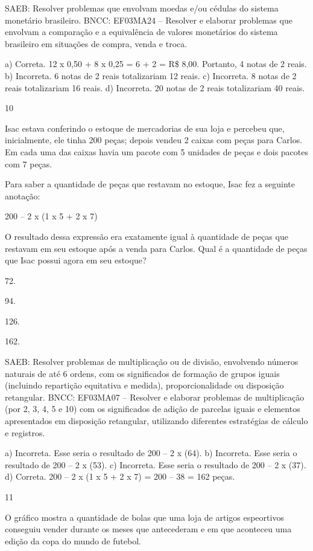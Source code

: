 \begin{multicols}{2}
{\begin{escolha}
{SAEB: Resolver problemas que envolvam moedas e/ou cédulas do sistema monetário brasileiro.
BNCC: EF03MA24 -- Resolver e elaborar problemas que envolvam a comparação e a equivalência de
valores monetários do sistema brasileiro em situações de compra, venda e troca.

a) Correta. 12 x 0,50 + 8 x 0,25 = 6 + 2 = R\$ 8,00. Portanto, 4 notas de 2 reais.
b) Incorreta. 6 notas de 2 reais totalizariam 12 reais.
c) Incorreta. 8 notas de 2 reais totalizariam 16 reais.
d) Incorreta. 20 notas de 2 reais totalizariam 40 reais.

\num{10}

Isac estava conferindo o estoque de mercadorias de sua loja e percebeu que, inicialmente, ele tinha 200 peças; depois vendeu 2 caixas com peças para Carlos. Em cada uma das caixas havia um pacote com 5 unidades de peças e dois pacotes com 7 peças.

Para saber a quantidade de peças que restavam no estoque, Isac fez a seguinte anotação:

200 -- 2 x (1 x 5 + 2 x 7)

O resultado dessa expressão era exatamente igual à quantidade de peças que restavam em seu estoque após a venda para Carlos. Qual é a quantidade de peças que Isac possui agora em seu estoque?

\begin{escolha}
\item
  72.
\item
  94.
\item
  126.
\item
  162.
\end{escolha}

SAEB: Resolver problemas de multiplicação ou de divisão, envolvendo números naturais de até 6 ordens, com os significados de formação de grupos iguais (incluindo repartição equitativa e medida), proporcionalidade ou disposição retangular.
BNCC: EF03MA07 – Resolver e elaborar problemas de multiplicação (por 2, 3, 4, 5 e 10) com os
significados de adição de parcelas iguais e elementos apresentados em disposição retangular, utilizando diferentes estratégias de cálculo e registros.

a) Incorreta. Esse seria o resultado de 200 -- 2 x (64).
b) Incorreta. Esse seria o resultado de 200 -- 2 x (53).
c) Incorreta. Esse seria o resultado de 200 -- 2 x (37).
d) Correta. 200 -- 2 x (1 x 5 + 2 x 7) = 200 -- 38 = 162 peças.

\num{11}

O gráfico mostra a quantidade de bolas que uma loja de artigos espeortivos conseguiu vender durante os meses que antecederam e em que aconteceu uma edição da copa do mundo de futebol.

}
\end{escolha}}
\end{multicols}
